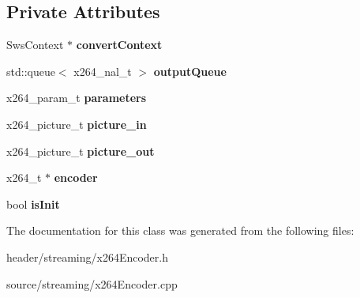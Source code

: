 \subsection*{Private Attributes}
\begin{DoxyCompactItemize}
\item 
\mbox{\label{classx264_encoder_a629cf7670998fbdfe8c2e4435a8926d8}} 
Sws\+Context $\ast$ {\bfseries convert\+Context}
\item 
\mbox{\label{classx264_encoder_ab7089dd3505a2001beb0aa2e217583e3}} 
std\+::queue$<$ x264\+\_\+nal\+\_\+t $>$ {\bfseries output\+Queue}
\item 
\mbox{\label{classx264_encoder_ade96f2ebacec1b3a8906f61a6a4630a3}} 
x264\+\_\+param\+\_\+t {\bfseries parameters}
\item 
\mbox{\label{classx264_encoder_af073faea7d159bf5b10fd1989729f8b4}} 
x264\+\_\+picture\+\_\+t {\bfseries picture\+\_\+in}
\item 
\mbox{\label{classx264_encoder_a817a8a2290aaa9bdb705faec52db276b}} 
x264\+\_\+picture\+\_\+t {\bfseries picture\+\_\+out}
\item 
\mbox{\label{classx264_encoder_a43e33f4f120d5b0eb4561e2ea9dd9892}} 
x264\+\_\+t $\ast$ {\bfseries encoder}
\item 
\mbox{\label{classx264_encoder_a3c4985e339e4d5b2ee0f6953426be125}} 
bool {\bfseries is\+Init}
\end{DoxyCompactItemize}


The documentation for this class was generated from the following files\+:\begin{DoxyCompactItemize}
\item 
header/streaming/x264\+Encoder.\+h\item 
source/streaming/x264\+Encoder.\+cpp\end{DoxyCompactItemize}

